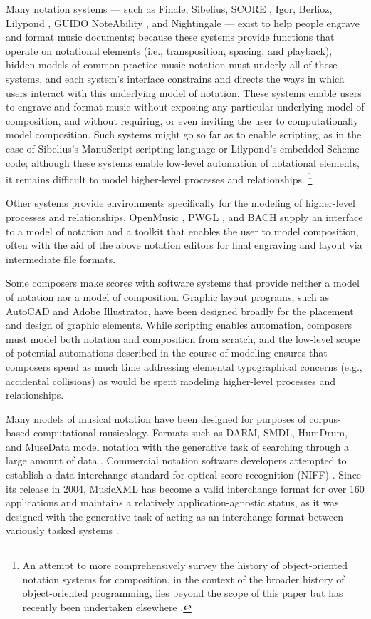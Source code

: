 \documentclass{article}
\begin{document}
Many notation systems --- such as Finale, Sibelius, SCORE \cite{Smith:1972mw},
Igor, Berlioz, Lilypond \cite{Nienhuys:2003ve}, GUIDO \cite{Hoos:1998bd}
NoteAbility \cite{hamel1noteability}, and Nightingale --- exist to help people
engrave and format music documents; because these systems provide functions that operate on
notational elements (i.e., transposition, spacing, and playback), hidden models of common practice music notation must underly all of
these systems, and each system's interface constrains and directs the ways in which
users interact with this underlying model of notation. These systems
enable users to engrave and format music without exposing any particular underlying model of composition, and without requiring, or even inviting the user to computationally model composition. Such systems might go so far as to enable scripting, as
in the case of Sibelius's ManuScript \cite{Technology:qc} scripting language or
Lilypond's embedded Scheme code; although these systems enable low-level automation of notational elements, it remains difficult to model higher-level processes and relationships. \footnote{An attempt to more comprehensively
survey the history of object-oriented notation systems for composition, in the
context of the broader history of object-oriented programming, lies beyond the
scope of this paper but has recently been undertaken elsewhere
\cite{trevino2013compositional}.}

Other systems provide environments specifically for the modeling of higher-level processes and relationships. OpenMusic \cite{Assayag:1999sw}, PWGL \cite{Laurson:2009qf}, and BACH
\cite{agostini2013real} supply an interface to a model of notation and a toolkit that enables the user to model composition, often with the aid of the above notation editors for
final engraving and layout via intermediate file formats. 

Some composers make scores with software systems that provide neither a model of notation nor a model of composition. Graphic layout programs, such as AutoCAD and Adobe Illustrator, have been designed broadly for the placement and design of graphic elements. While scripting enables automation, composers must model both notation and composition from scratch, and the low-level scope of potential automations described in the course of modeling ensures that composers spend as much time addressing elemental typographical concerns (e.g., accidental collisions) as would be spent modeling higher-level processes and relationships.

Many models of musical notation have been designed for purposes of
corpus-based computational musicology. Formats such as DARM, SMDL,
HumDrum, and MuseData model notation with the generative task of searching
through a large amount of data \cite{Selfridge-Field:1997ud}. Commercial
notation software developers attempted to establish a data interchange standard
for optical score recognition (NIFF) \cite{niff1995niff}. Since its release in
2004, MusicXML has become a valid interchange format for over 160 applications
and maintains a relatively application-agnostic status, as it was designed with
the generative task of acting as an interchange format between variously tasked
systems \cite{Good:2001if}.
\end{document}
